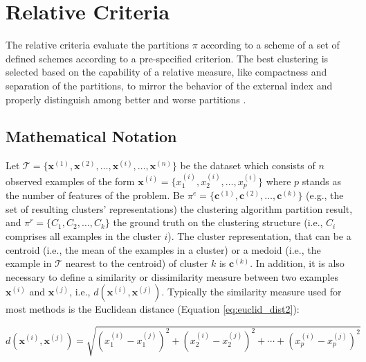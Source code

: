 \section{Relative Criteria}
\label{sec:relative_criterian}

The relative criteria evaluate the partitions $\pi$ according to a scheme of a set of defined schemes according to a pre-specified criterion. The best clustering is selected based on the capability of a relative measure, like compactness and separation of the partitions, to mirror the behavior of the external index and properly distinguish among better and worse partitions \cite{vendramin2010relative}.


\subsection{Mathematical Notation}

Let $\mathcal{T} = \{\mathbf{x}^{(1)}, \mathbf{x}^{(2)},\ldots, \mathbf{x}^{(i)}, \ldots, \mathbf{x}^{(n)}\}$ be the dataset which consists of $n$ observed examples of the form $\mathbf{x}^{(i)} = \{x^{(i)}_1 ,x^{(i)}_{2},\ldots,x^{(i)}_{p}\}$ where $p$ stands as the number of features of the problem. Be $\pi^e=\{\mathbf{c}^{(1)}, \mathbf{c}^{(2)}, \ldots, \mathbf{c}^{(k)}\}$ (e.g., the set of resulting clusters' representations) the clustering algorithm partition result, and $\pi^r=\{C_1, C_2, \ldots, C_k\}$ the ground truth on the clustering structure (i.e., $C_i$ comprises all examples in the cluster $i$). The cluster representation, that can be a centroid (i.e., the mean of the examples in a cluster) or a medoid (i.e., the example in $\mathcal{T}$ nearest to the centroid) of cluster $k$ is $\mathbf{c}^{(k)}$. In addition, it is also necessary to define a similarity or dissimilarity measure between two examples $\mathbf{x}^{(i)}$ and $\mathbf{x}^{(j)}$, i.e., $d(\mathbf{x}^{(i)},\mathbf{x}^{(j)})$. Typically the similarity measure used for most methods is the Euclidean distance (Equation \ref{eq:euclid_dist2}): 


\begin{equation}
    d(\textbf{x}^{(i)},\textbf{x}^{(j)}) = \sqrt{(x^{(i)}_{1} - x^{(j)}_{1})^{2} + (x^{(i)}_{2} - x^{(j)}_{2})^{2} + \cdots + (x^{(i)}_p - x^{(j)}_{p})^{2}}
    \label{eq:euclid_dist2}
\end{equation}

